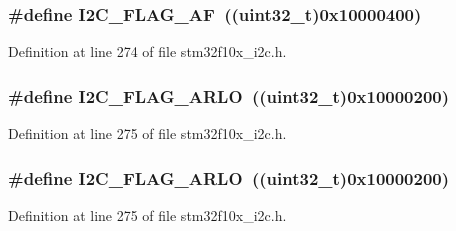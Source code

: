 \subsubsection[{\texorpdfstring{I2\+C\+\_\+\+F\+L\+A\+G\+\_\+\+AF}{I2C_FLAG_AF}}]{\setlength{\rightskip}{0pt plus 5cm}\#define I2\+C\+\_\+\+F\+L\+A\+G\+\_\+\+AF~(({\bf uint32\+\_\+t})0x10000400)}\hypertarget{group___i2_c__flags__definition_ga2f89dbba9b964e6ade1480705e7a97d4}{}\label{group___i2_c__flags__definition_ga2f89dbba9b964e6ade1480705e7a97d4}


Definition at line 274 of file stm32f10x\+\_\+i2c.\+h.

\subsubsection[{\texorpdfstring{I2\+C\+\_\+\+F\+L\+A\+G\+\_\+\+A\+R\+LO}{I2C_FLAG_ARLO}}]{\setlength{\rightskip}{0pt plus 5cm}\#define I2\+C\+\_\+\+F\+L\+A\+G\+\_\+\+A\+R\+LO~(({\bf uint32\+\_\+t})0x10000200)}\hypertarget{group___i2_c__flags__definition_gae1e67936f4780e42b8bbe04ac9c20a7b}{}\label{group___i2_c__flags__definition_gae1e67936f4780e42b8bbe04ac9c20a7b}


Definition at line 275 of file stm32f10x\+\_\+i2c.\+h.

\subsubsection[{\texorpdfstring{I2\+C\+\_\+\+F\+L\+A\+G\+\_\+\+A\+R\+LO}{I2C_FLAG_ARLO}}]{\setlength{\rightskip}{0pt plus 5cm}\#define I2\+C\+\_\+\+F\+L\+A\+G\+\_\+\+A\+R\+LO~(({\bf uint32\+\_\+t})0x10000200)}\hypertarget{group___i2_c__flags__definition_gae1e67936f4780e42b8bbe04ac9c20a7b}{}\label{group___i2_c__flags__definition_gae1e67936f4780e42b8bbe04ac9c20a7b}


Definition at line 275 of file stm32f10x\+\_\+i2c.\+h.

